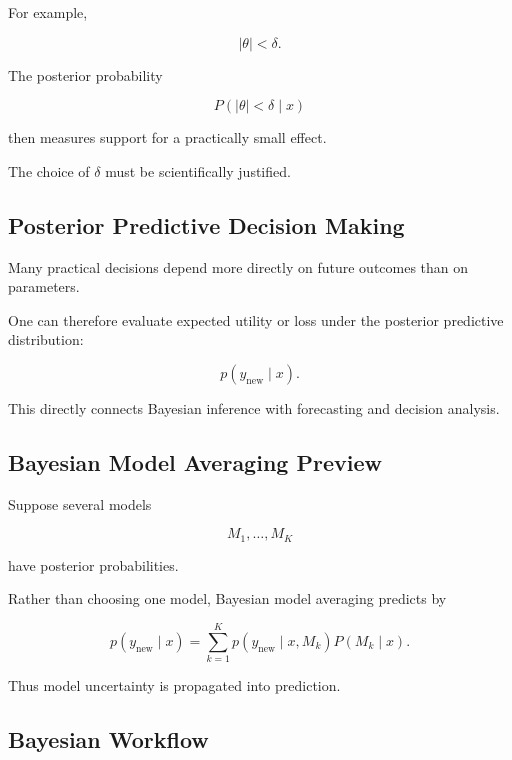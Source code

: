 For example,

\[
\boxed{
|\theta|<\delta.
}
\]

The posterior probability

\[
\boxed{
P
(
|\theta|<\delta
\mid x
)
}
\]

then measures support for a practically small effect.

The choice of \(\delta\) must be scientifically justified.

\subsection{Posterior Predictive Decision Making}
\label{subsec:posterior-predictive-decision}

Many practical decisions depend more directly on future outcomes than on
parameters.

One can therefore evaluate expected utility or loss under the posterior
predictive distribution:

\[
\boxed{
p
(
y_{\text{new}}
\mid x
).
}
\]

This directly connects Bayesian inference with forecasting and decision
analysis.

\subsection{Bayesian Model Averaging Preview}
\label{subsec:bayesian-model-averaging}

Suppose several models

\[
M_1,\ldots,M_K
\]

have posterior probabilities.

Rather than choosing one model, Bayesian model averaging predicts by

\[
\boxed{
p
(
y_{\text{new}}
\mid x
)
=
\sum_{k=1}^{K}
p
(
y_{\text{new}}
\mid x,M_k
)
P
(
M_k\mid x
).
}
\]

Thus model uncertainty is propagated into prediction.

\subsection{Bayesian Workflow}
\label{subsec:bayesian-workflow}


